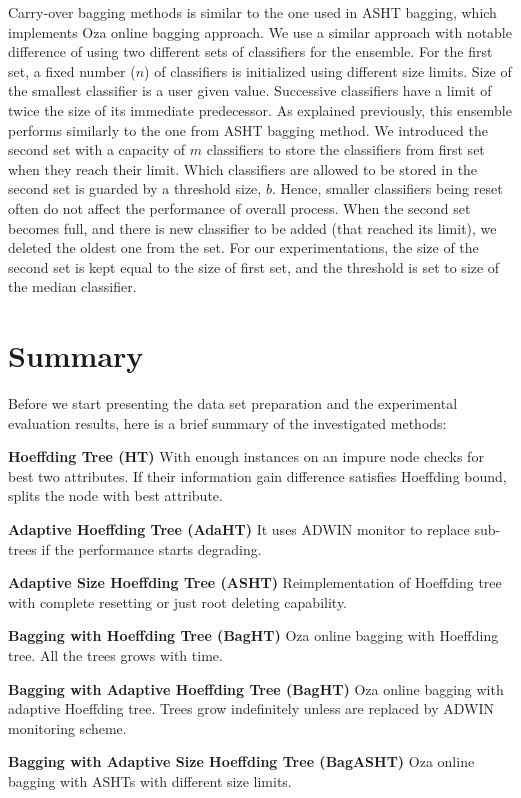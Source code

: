 Carry-over bagging methods is similar to the one used in ASHT bagging, which implements Oza online bagging approach. We use a similar approach with notable difference of using two different sets of classifiers for the ensemble. For the first set, a fixed number ($n$) of classifiers is initialized using different  size limits. Size of the smallest classifier is a user given value. Successive classifiers have a limit of twice the size of its immediate predecessor. As explained previously, this ensemble performs similarly to the one from ASHT bagging method. We introduced the second set with a capacity of $m$ classifiers to store the classifiers from first set when they reach their limit. Which classifiers are allowed to be stored in the second set is guarded by a threshold size, $b$. Hence, smaller classifiers being reset often do not affect the performance of overall process. When the second set becomes full, and there is new classifier to be added (that reached its limit), we deleted the oldest one from the set. For our experimentations, the size of the second set is kept equal to the size of first set, and the threshold is set to size of the median classifier. 


\section{Summary}
Before we start presenting the data set preparation and the experimental evaluation results, here is a brief summary of the investigated methods:

\textbf{Hoeffding Tree (HT)} With enough instances on an impure node checks for best two attributes. If their information gain difference satisfies Hoeffding bound, splits the node with best attribute.

\textbf{Adaptive Hoeffding Tree (AdaHT)} It uses ADWIN monitor to replace sub-trees if the performance starts degrading.

\textbf{Adaptive Size Hoeffding Tree (ASHT)} Reimplementation of Hoeffding tree with complete resetting or just root deleting capability.

\textbf{Bagging with Hoeffding Tree (BagHT)} Oza online bagging with Hoeffding tree. All the trees grows with time.

\textbf{Bagging with Adaptive Hoeffding Tree (BagHT)} Oza online bagging with adaptive Hoeffding tree. Trees grow indefinitely unless are replaced by ADWIN monitoring scheme.

\textbf{Bagging with Adaptive Size Hoeffding Tree (BagASHT)} Oza online bagging with ASHTs with different size limits.

